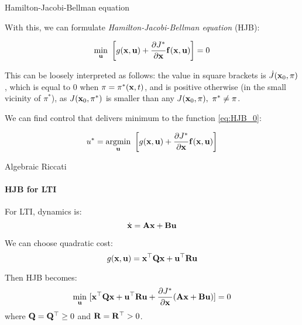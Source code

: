 \documentclass{beamer}
\begin{document}
\begin{frame}{Hamilton-Jacobi-Bellman equation}
\begin{flushleft}

With this, we can formulate \emph{Hamilton-Jacobi-Bellman equation} (HJB):

\begin{equation}
\label{eq:HJB_0}
\underset{\bo{u}}{\min} \ 
\left[ 
g(\bo{x}, \bo{u}) + 
\frac{\partial J^*}{\partial \bo{x}} \bo{f} (\bo{x}, \bo{u}) 
\right] = 0
\end{equation}

This can be loosely interpreted as follows: the value in square brackets is $\dot J(\mathbf{x}_0, \pi)$, which is equal to 0 when $\pi = \pi^*(\mathbf{x}, t)$, and is positive otherwise (in the small vicinity of $\pi^*$), as $J(\mathbf{x}_0, \pi^*)$ is smaller than any $J(\mathbf{x}_0, \pi), \ \pi^* \neq \pi$.

\bigskip


We can find control that delivers minimum to the function \eqref{eq:HJB_0}:

\begin{equation}
u^* = \underset{\bo{u}}{\text{argmin}} \ 
\left[ 
g(\bo{x}, \bo{u}) + 
\frac{\partial J^*}{\partial \bo{x}} \bo{f} (\bo{x}, \bo{u}) \right] 
\end{equation}

\end{flushleft}
\end{frame}





\begin{frame}{Algebraic Riccati}
\framesubtitle{HJB for LTI}
\begin{flushleft}

For LTI, dynamics is:
\begin{equation}
\dot {\mathbf{x}} = \mathbf{A}  \mathbf{x} + \mathbf{B} \mathbf{u}
\end{equation}

We can choose quadratic cost:
\begin{equation}
g(\mathbf  x, \mathbf  u) = 
\mathbf  x^\top \mathbf{Q} \mathbf{x} +
\mathbf  u^\top \mathbf{R} \mathbf{u} 
\end{equation}

Then HJB becomes:
\begin{equation}
\underset{\mathbf{u}}{\min} \ [ 
\mathbf{x}^\top \mathbf{Q} \mathbf{x} +
\mathbf{u}^\top \mathbf{R} \mathbf{u} + 
\frac{\partial J^*}{\partial \mathbf{x}} 
(\mathbf{A} \mathbf{x} + \mathbf{B} \mathbf{u})] = 0
\end{equation}
%
where $\mathbf{Q} = \mathbf{Q}^\top \geq 0 $ and $\mathbf{R} = \mathbf{R}^\top > 0$.

\end{flushleft}
\end{frame}
\end{document}
